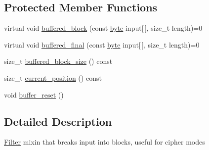 \subsection*{Protected Member Functions}
\begin{DoxyCompactItemize}
\item 
virtual void \hyperlink{classBotan_1_1Buffered__Filter_a82fc4d51467272e3845275a0b2387f7c}{buffered\-\_\-block} (const \hyperlink{namespaceBotan_a7d793989d801281df48c6b19616b8b84}{byte} input\mbox{[}$\,$\mbox{]}, size\-\_\-t length)=0
\item 
virtual void \hyperlink{classBotan_1_1Buffered__Filter_ad26f32571a902205ddb3253a3b80ab84}{buffered\-\_\-final} (const \hyperlink{namespaceBotan_a7d793989d801281df48c6b19616b8b84}{byte} input\mbox{[}$\,$\mbox{]}, size\-\_\-t length)=0
\item 
size\-\_\-t \hyperlink{classBotan_1_1Buffered__Filter_ae13766116416246fc2c0fcc2cfb12def}{buffered\-\_\-block\-\_\-size} () const 
\item 
size\-\_\-t \hyperlink{classBotan_1_1Buffered__Filter_a84f40803f7c900e9ac8063ea5da6ccbc}{current\-\_\-position} () const 
\item 
void \hyperlink{classBotan_1_1Buffered__Filter_aedfb7e6380f4c3a3a6bd9dc6be5bd179}{buffer\-\_\-reset} ()
\end{DoxyCompactItemize}


\subsection{Detailed Description}
\hyperlink{classBotan_1_1Filter}{Filter} mixin that breaks input into blocks, useful for cipher modes 

